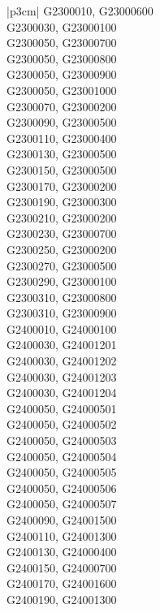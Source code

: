 \begin{customLongTable}{ |p{3cm}| }
G2300010, G23000600 \\ \hline
G2300030, G23000100 \\ \hline
G2300050, G23000700 \\ \hline
G2300050, G23000800 \\ \hline
G2300050, G23000900 \\ \hline
G2300050, G23001000 \\ \hline
G2300070, G23000200 \\ \hline
G2300090, G23000500 \\ \hline
G2300110, G23000400 \\ \hline
G2300130, G23000500 \\ \hline
G2300150, G23000500 \\ \hline
G2300170, G23000200 \\ \hline
G2300190, G23000300 \\ \hline
G2300210, G23000200 \\ \hline
G2300230, G23000700 \\ \hline
G2300250, G23000200 \\ \hline
G2300270, G23000500 \\ \hline
G2300290, G23000100 \\ \hline
G2300310, G23000800 \\ \hline
G2300310, G23000900 \\ \hline
G2400010, G24000100 \\ \hline
G2400030, G24001201 \\ \hline
G2400030, G24001202 \\ \hline
G2400030, G24001203 \\ \hline
G2400030, G24001204 \\ \hline
G2400050, G24000501 \\ \hline
G2400050, G24000502 \\ \hline
G2400050, G24000503 \\ \hline
G2400050, G24000504 \\ \hline
G2400050, G24000505 \\ \hline
G2400050, G24000506 \\ \hline
G2400050, G24000507 \\ \hline
G2400090, G24001500 \\ \hline
G2400110, G24001300 \\ \hline
G2400130, G24000400 \\ \hline
G2400150, G24000700 \\ \hline
G2400170, G24001600 \\ \hline
G2400190, G24001300 \\ \hline

\end{customLongTable}
